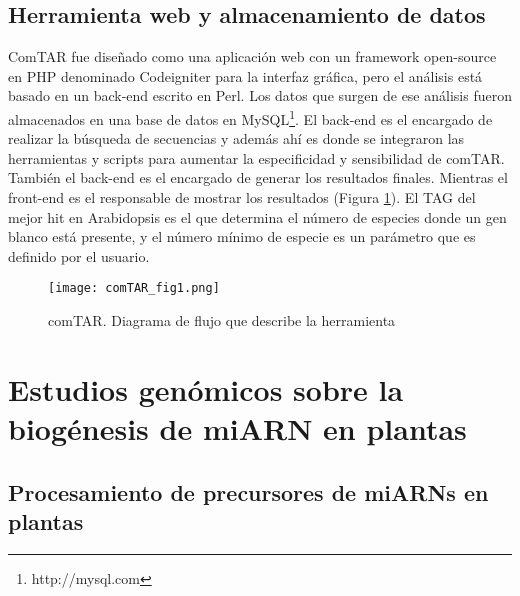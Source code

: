 \subsection{Herramienta web y almacenamiento de datos}
ComTAR fue diseñado como una aplicación web con un framework open-source en PHP denominado Codeigniter para la interfaz gráfica, pero el análisis está basado en un back-end escrito en Perl.
Los datos que surgen de ese análisis fueron almacenados en una base de datos en MySQL\footnote{http://mysql.com}.
El back-end es el encargado de realizar la búsqueda de secuencias y además ahí es donde se integraron las herramientas y scripts para aumentar la especificidad y sensibilidad de comTAR. 
También el back-end es el encargado de generar los resultados finales.
Mientras el front-end es el responsable de mostrar los resultados (Figura \ref{fig:comTAR_fig1}).
El TAG del mejor hit en Arabidopsis es el que determina el número de especies donde un gen blanco está presente, y el número mínimo de especie es un parámetro que es definido por el usuario.

\begin{figure}[htbp!] 
    \centering    
    \texttt{[image: comTAR\_fig1.png]}
    \caption[comTAR. Diagrama de flujo]{comTAR. Diagrama de flujo que describe la herramienta}
    \label{fig:comTAR_fig1}
\end{figure}

\section{Estudios genómicos sobre la biogénesis de miARN en plantas}

\subsection{Procesamiento de precursores de miARNs en plantas}


